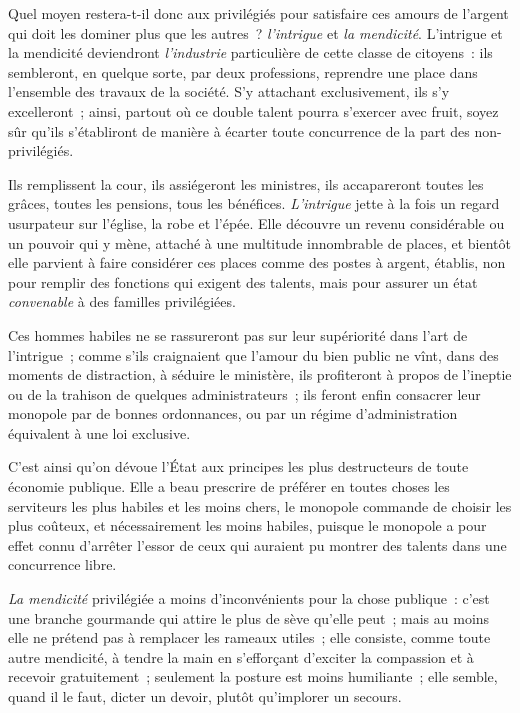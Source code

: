 \documentclass[french,twoside]{book} %
\begin{document}
Quel moyen restera-t-il donc aux privilégiés pour satisfaire ces amours de l’argent qui doit les dominer plus que les autres ? {\itshape l’intrigue} et {\itshape la mendicité}. L’intrigue et la mendicité deviendront {\itshape l’industrie} particulière de cette classe de citoyens : ils sembleront, en quelque sorte, par deux professions, reprendre une place dans l’ensemble des travaux de la société. S’y attachant exclusivement, ils s’y excelleront ; ainsi, partout où ce double talent pourra s’exercer avec fruit, soyez sûr qu’ils s’établiront de manière à écarter toute concurrence de la part des non-privilégiés.\par
Ils remplissent la cour, ils assiégeront les ministres, ils accapareront toutes les grâces, toutes les pensions, tous les bénéfices. {\itshape L’intrigue} jette à la fois un regard usurpateur sur l’église, la robe et l’épée. Elle découvre un revenu considérable ou un pouvoir qui y mène, attaché à une multitude innombrable de places, et bientôt elle parvient à faire considérer ces places comme des postes à argent, établis, non pour remplir des fonctions qui exigent des talents, mais pour assurer un état {\itshape convenable} à des familles privilégiées.\par
Ces hommes habiles ne se rassureront pas sur leur supériorité dans l’art de l’intrigue ; comme s’ils craignaient que l’amour du bien public ne vînt, dans des moments de distraction, à séduire le ministère, ils profiteront à propos de l’ineptie ou de la trahison de quelques administrateurs ; ils feront enfin consacrer leur monopole par de bonnes ordonnances, ou par un régime d’administration équivalent à une loi exclusive.\par
C’est ainsi qu’on dévoue l’État aux principes les plus destructeurs de toute économie publique. Elle a beau prescrire de préférer en toutes choses les serviteurs les plus habiles et les moins chers, le monopole commande de choisir les plus coûteux, et nécessairement les moins habiles, puisque le monopole a pour effet connu d’arrêter l’essor de ceux qui auraient pu montrer des talents dans une concurrence libre.\par
{\itshape La mendicité} privilégiée a moins d’inconvénients pour la chose publique : c’est une branche gourmande qui attire le plus de sève qu’elle peut ; mais au moins elle ne prétend pas à remplacer les rameaux utiles ; elle consiste, comme toute autre mendicité, à tendre la main en s’efforçant d’exciter la compassion et à recevoir gratuitement ; seulement la posture est moins humiliante ; elle semble, quand il le faut, dicter un devoir, plutôt qu’implorer un secours.\par
\end{document}

